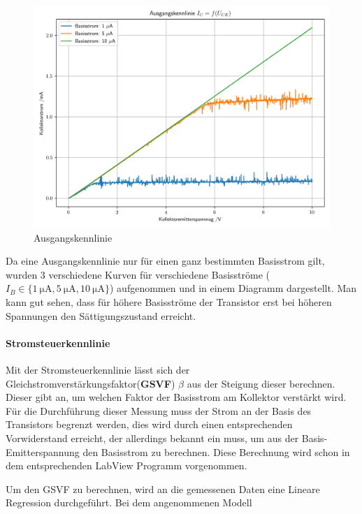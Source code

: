 \documentclass[12pt,twoside,a4paper]{scrartcl}
\begin{document}
            \begin{figure}[H]
                \centering

                \includegraphics[width = 0.9 \textwidth]{Plots/Transistor/Ausgangskennlinen}

                \caption{Ausgangskennlinie}
            \end{figure}

            Da eine Ausgangskennlinie nur für einen ganz bestimmten Basisstrom gilt, wurden 3 verschiedene Kurven für verschiedene Basisströme ($I_B \in \{ \SI{1}{\micro \ampere}, \SI{5}{\micro \ampere}, \SI{10}{\micro \ampere} \}$) aufgenommen und in einem Diagramm dargestellt. Man kann gut sehen, dass für höhere Basisströme der Transistor erst bei höheren Spannungen den Sättigungszustand erreicht.


    \paragraph{Stromsteuerkennlinie}

        Mit der Stromsteuerkennlinie lässt sich der Gleichstromverstärkungsfaktor(\textbf{GSVF}) $\beta$ aus der Steigung dieser berechnen. Dieser gibt an, um welchen Faktor der Basisstrom am Kollektor verstärkt wird.
        Für die Durchführung dieser Messung muss der Strom an der Basis des Transistors begrenzt werden, dies wird durch einen entsprechenden Vorwiderstand erreicht, der allerdings bekannt ein muss, um aus der Basis-Emitterspannung den Basisstrom zu berechnen. Diese Berechnung wird schon in dem entsprechenden LabView Programm vorgenommen.

        Um den GSVF zu berechnen, wird an die gemessenen Daten eine Lineare Regression durchgeführt. Bei dem angenommenen Modell
\end{document}
